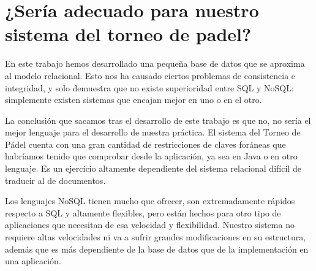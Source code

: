 \chapter{¿Sería adecuado para nuestro sistema del torneo de padel?}{}
{\large
En este trabajo hemos desarrollado una pequeña base de datos que se aproxima al modelo relacional. Esto nos ha causado ciertos problemas de consistencia e integridad, y solo demuestra que no existe superioridad entre SQL y NoSQL: simplemente existen sistemas que encajan mejor en uno o en el otro.


La conclusión que sacamos tras el desarrollo de este trabajo es que no, no sería el mejor lenguaje para el desarrollo de nuestra práctica. El sistema del Torneo de Pádel cuenta con una gran cantidad de restricciones de claves foráneas que habríamos tenido que comprobar desde la aplicación, ya sea en Java o en otro lenguaje. Es un ejercicio altamente dependiente del sistema relacional difícil de traducir al de documentos.


Los lenguajes NoSQL tienen mucho que ofrecer, son extremadamente rápidos respecto a SQL y altamente flexibles, pero están hechos para otro tipo de aplicaciones que necesitan de esa velocidad y flexibilidad. Nuestro sistema no requiere altas velocidades ni va a sufrir grandes modificaciones en su estructura, además que es más dependiente de la base de datos que de la implementación en una aplicación.
}
